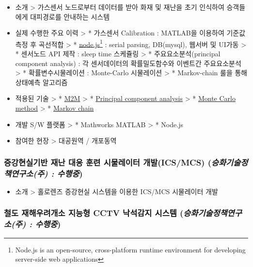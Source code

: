 \documentclass[]{article}
\begin{document}
\begin{itemize}
\item
  소개 \textgreater{} 가스센서 노드로부터 데이터를 받아 화재 및 재난을
  초기 인식하여 승객들에게 대피경로를 안내하는 시스템
\item
  실제 수행한 주요 이력 \textgreater{} * 가스센서 Calibration : MATLAB을
  이용하여 기준값 측정 후 곡선적합 \textgreater{} *
  \href{https://nodejs.org}{node.js}\footnote{Node.js is an open-source,
    cross-platform runtime environment for developing server-side web
    applications} : serial parsing, DB(mysql), 웹서버 및 UI가동
  \textgreater{} * 센서노드 API 제작 : sleep time 스케쥴링
  \textgreater{} * 주요요소분석(principal component analysis) : 각
  센서데이터의 확률밀도함수와 이벤트간 주요요소분석 \textgreater{} *
  확률변수시물레이션 : Monte-Carlo 시물레이션 \textgreater{} *
  Markov-chain 룰을 통해 상태예측 알고리즘
\item
  적용된 기술 \textgreater{} *
  \href{https://en.wikipedia.org/wiki/Machine_to_machine}{M2M}
  \textgreater{} *
  \href{https://en.wikipedia.org/wiki/Principal_component_analysis}{Principal
  component analysis} \textgreater{} *
  \href{https://en.wikipedia.org/wiki/Monte_Carlo_method}{Monte Carlo
  method} \textgreater{} *
  \href{https://en.wikipedia.org/wiki/Markov_chain}{Markov chain}
\item
  개발 S/W 플랫폼 \textgreater{} * Mathworks MATLAB \textgreater{} *
  Node.js
\item
  참여한 현장 \textgreater{} 대공원역 / 개포동역
\end{itemize}

\subsubsection{증강현실기반 재난 대응 훈련 시물레이터 개발(ICS/MCS) (\emph{승화기술정책연구소(주) : \textbf{수행중}})}

\begin{itemize}
\item
  소개 \textgreater{} 홀로렌즈 증강현실 시스템을 이용한 ICS/MCS
  시물레이터 개발
\end{itemize}

\subsubsection{철도 재해우려개소 지능형 CCTV 낙석감지 시스템 (\emph{승화기술정책연구소(주) : \textbf{수행중}})}
\end{document}

